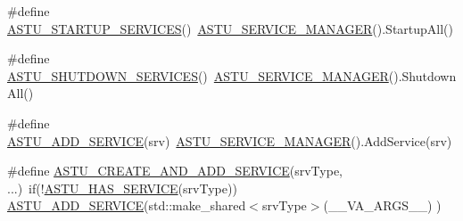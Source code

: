 \begin{DoxyCompactItemize}
\item 
\#define \hyperlink{group__srv__group_gab16fd0e9f158b318812197ee283a8484}{A\+S\+T\+U\+\_\+\+S\+T\+A\+R\+T\+U\+P\+\_\+\+S\+E\+R\+V\+I\+C\+ES}()~\hyperlink{group__srv__group_ga5216c57cf872d6a0c05d0e6f33c66fc7}{A\+S\+T\+U\+\_\+\+S\+E\+R\+V\+I\+C\+E\+\_\+\+M\+A\+N\+A\+G\+ER}().Startup\+All()
\item 
\#define \hyperlink{group__srv__group_ga97369e673940c499b1cd623c76aaafe5}{A\+S\+T\+U\+\_\+\+S\+H\+U\+T\+D\+O\+W\+N\+\_\+\+S\+E\+R\+V\+I\+C\+ES}()~\hyperlink{group__srv__group_ga5216c57cf872d6a0c05d0e6f33c66fc7}{A\+S\+T\+U\+\_\+\+S\+E\+R\+V\+I\+C\+E\+\_\+\+M\+A\+N\+A\+G\+ER}().Shutdown\+All()
\item 
\#define \hyperlink{group__srv__group_ga8c6572c2ee70b67d9dda0b8b0d77a7d2}{A\+S\+T\+U\+\_\+\+A\+D\+D\+\_\+\+S\+E\+R\+V\+I\+CE}(srv)~\hyperlink{group__srv__group_ga5216c57cf872d6a0c05d0e6f33c66fc7}{A\+S\+T\+U\+\_\+\+S\+E\+R\+V\+I\+C\+E\+\_\+\+M\+A\+N\+A\+G\+ER}().Add\+Service(srv)
\item 
\#define \hyperlink{group__srv__group_ga91256015ad12618b8eda42106056a927}{A\+S\+T\+U\+\_\+\+C\+R\+E\+A\+T\+E\+\_\+\+A\+N\+D\+\_\+\+A\+D\+D\+\_\+\+S\+E\+R\+V\+I\+CE}(srv\+Type, ...)~if(!\hyperlink{group__srv__group_ga8b3cd4edfd24593b12bc662acf62e9a1}{A\+S\+T\+U\+\_\+\+H\+A\+S\+\_\+\+S\+E\+R\+V\+I\+CE}(srv\+Type)) \hyperlink{group__srv__group_ga8c6572c2ee70b67d9dda0b8b0d77a7d2}{A\+S\+T\+U\+\_\+\+A\+D\+D\+\_\+\+S\+E\+R\+V\+I\+CE}(std\+::make\+\_\+shared$<$srv\+Type$>$(\+\_\+\+\_\+\+V\+A\+\_\+\+A\+R\+G\+S\+\_\+\+\_\+) )
\end{DoxyCompactItemize}
